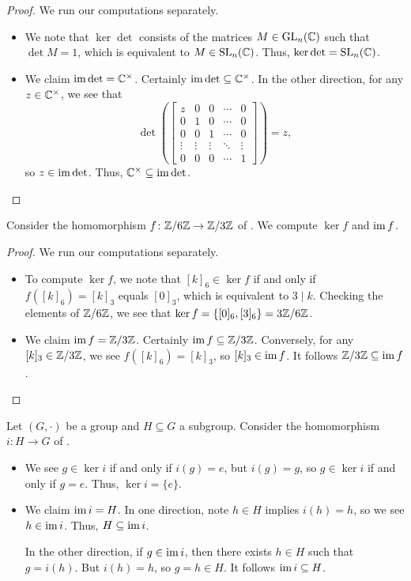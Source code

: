 \documentclass[../notes.tex]{subfiles}
\begin{document}
\begin{proof}
    We run our computations separately.
    \begin{itemize}
        \item We note that $\ker\det$ consists of the matrices $M\in\operatorname{GL}_n(\mathbb C)$ such that $\det M=1$, which is equivalent to $M\in\operatorname{SL}_n(\mathbb C)$. Thus, $\ker\det=\operatorname{SL}_n(\mathbb C)$.
        \item We claim $\operatorname{im}\det=\mathbb C^\times$. Certainly $\operatorname{im}\det\subseteq\mathbb C^\times$. In the other direction, for any $z\in\mathbb C^\times$, we see that
        \[\det\left(\begin{bmatrix}
            z & 0 & 0 & \cdots & 0 \\
            0 & 1 & 0 & \cdots & 0 \\
            0 & 0 & 1 & \cdots & 0 \\
            \vdots & \vdots & \vdots & \ddots & \vdots \\
            0 & 0 & 0 & \cdots & 1
        \end{bmatrix}\right)=z,\]
        so $z\in\operatorname{im}\det$. Thus, $\mathbb C^\times\subseteq\operatorname{im}\det$.
        \qedhere
    \end{itemize}
\end{proof}
\begin{example} \label{ex:z6z-to-z3z-ker-im}
    Consider the homomorphism $f\colon\mathbb Z/6\mathbb Z\to\mathbb Z/3\mathbb Z$ of . We compute $\ker f$ and $\operatorname{im} f$.
\end{example}
\begin{proof}
    We run our computations separately.
    \begin{itemize}
        \item To compute $\ker f$, we note that $[k]_6\in\ker f$ if and only if $f([k]_6)=[k]_3$ equals $[0]_3$, which is equivalent to $3\mid k$. Checking the elements of $\mathbb Z/6\mathbb Z$, we see that $\ker f=\{[0]_6,[3]_6\}=3\mathbb Z/6\mathbb Z$.
        \item We claim $\operatorname{im} f=\mathbb Z/3\mathbb Z$. Certainly $\operatorname{im} f\subseteq\mathbb Z/3\mathbb Z$. Conversely, for any $[k]_3\in\mathbb Z/3\mathbb Z$, we see $f([k]_6)=[k]_3$, so $[k]_3\in\operatorname{im} f$. It follows $\mathbb Z/3\mathbb Z\subseteq\operatorname{im} f$.
        \qedhere
    \end{itemize}
\end{proof}
\begin{example}
    Let $(G,\cdot)$ be a group and $H\subseteq G$ a subgroup. Consider the homomorphism $i\colon H\to G$ of .
    \begin{itemize}
        \item We see $g\in\ker i$ if and only if $i(g)=e$, but $i(g)=g$, so $g\in\ker i$ if and only if $g=e$. Thus, $\ker i=\{e\}$.
        \item We claim $\operatorname{im} i=H$. In one direction, note $h\in H$ implies $i(h)=h$, so we see $h\in\operatorname{im} i$. Thus, $H\subseteq\operatorname{im} i$.
        
        In the other direction, if $g\in\operatorname{im} i$, then there exists $h\in H$ such that $g=i(h)$. But $i(h)=h$, so $g=h\in H$. It follows $\operatorname{im} i\subseteq H$.
    \end{itemize}
\end{example}
\end{document}
